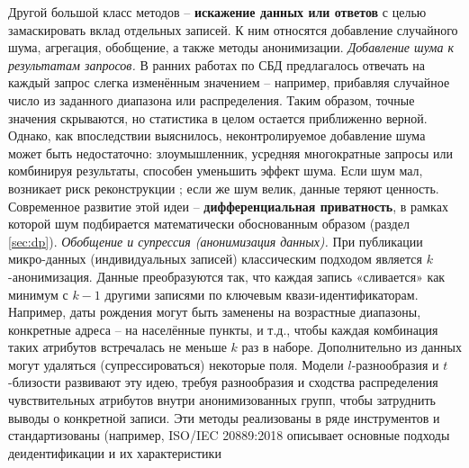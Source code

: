Другой большой класс методов – \textbf{искажение данных или ответов} с целью замаскировать вклад отдельных записей. К ним относятся добавление случайного шума, агрегация, обобщение, а также методы анонимизации. \textit{Добавление шума к результатам запросов.} В ранних работах по СБД предлагалось отвечать на каждый запрос слегка изменённым значением – например, прибавляя случайное число из заданного диапазона или распределения. Таким образом, точные значения скрываются, но статистика в целом остается приближенно верной. Однако, как впоследствии выяснилось, неконтролируемое добавление шума может быть недостаточно: злоумышленник, усредняя многократные запросы или комбинируя результаты, способен уменьшить эффект шума. Если шум мал, возникает риск реконструкции \autocite{differentialprivacy-org}
; если же шум велик, данные теряют ценность. Современное развитие этой идеи – \textbf{дифференциальная приватность}, в рамках которой шум подбирается математически обоснованным образом (раздел \ref{sec:dp}). \textit{Обобщение и супрессия (анонимизация данных).} При публикации микро-данных (индивидуальных записей) классическим подходом является $k$-анонимизация. Данные преобразуются так, что каждая запись «сливается» как минимум с $k-1$ другими записями по ключевым квази-идентификаторам. Например, даты рождения могут быть заменены на возрастные диапазоны, конкретные адреса – на населённые пункты, и т.д., чтобы каждая комбинация таких атрибутов встречалась не меньше $k$ раз в наборе. Дополнительно из данных могут удаляться (супрессироваться) некоторые поля. Модели $l$-разнообразия и $t$-близости развивают эту идею, требуя разнообразия и сходства распределения чувствительных атрибутов внутри анонимизованных групп, чтобы затруднить выводы о конкретной записи. Эти методы реализованы в ряде инструментов и стандартизованы (например, ISO/IEC 20889:2018 описывает основные подходы деидентификации и их характеристики \autocite{ISO-IEC-20889-2018}
